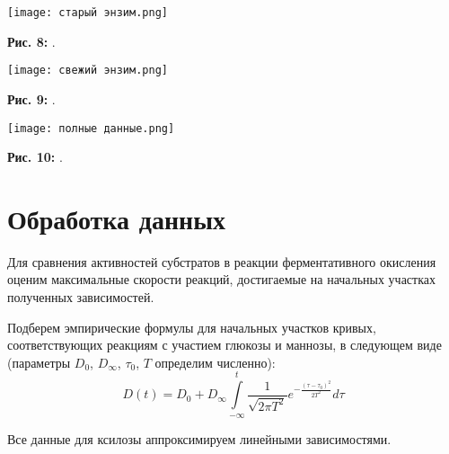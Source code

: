 \documentclass[a4paper]{article}
\begin{document}
\graphicspath{{./images/}}
		\begin{center}
		
			\texttt{[image: старый энзим.png]}
    \par
\textbf{Рис. 8: }.
 \end{center}
\par \vspace{0.5 cm}

\graphicspath{{./images/}}
		\begin{center}
		
			\texttt{[image: свежий энзим.png]}
    \par
\textbf{Рис. 9: }.
 \end{center}
\par \vspace{0.5 cm}

\graphicspath{{./images/}}
		\begin{center}
		
			\texttt{[image: полные данные.png]}
    \par
\textbf{Рис. 10: }.
 \end{center}
\par \vspace{0.5 cm}


\section{\LARGE Обработка данных}
\par \hspace{0.33 cm}
Для сравнения активностей субстратов в реакции ферментативного окисления оценим максимальные скорости реакций, достигаемые на начальных участках полученных зависимостей. \par
Подберем эмпирические формулы для начальных участков кривых, соответствующих реакциям с участием глюкозы и маннозы, в следующем виде (параметры $D_0$, $D_{\infty}$, $\tau_0$, $T$ определим численно):
\Large
\[
D(t) = D_0 + D_{\infty} \int\limits_{-\infty}^{t}\frac{1}{\sqrt{2\pi T^2}} e^{-\frac{(\tau - \tau_0)^2}{2 T^2}}d\tau \] \large
\par

Все данные для ксилозы аппроксимируем линейными зависимостями.
\end{document}
